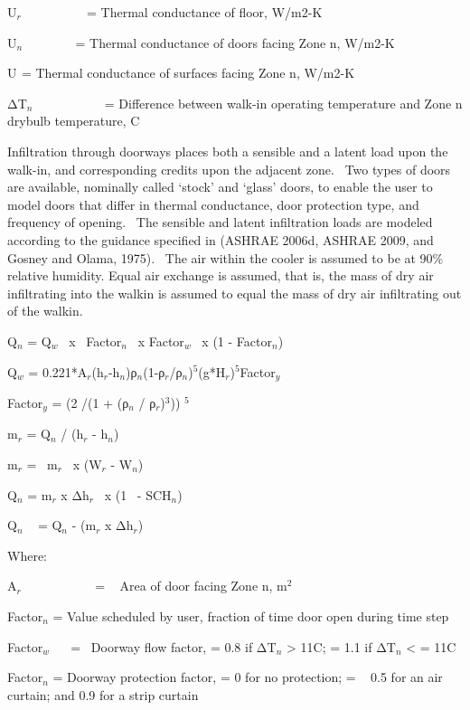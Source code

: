U\(_{r}\) ~~~~~~~~~ = Thermal conductance of floor, W/m2-K

U\(_{n}\) ~~~~~~~ = Thermal conductance of doors facing Zone n, W/m2-K

U\(_{ }\) = Thermal conductance of surfaces facing Zone n, W/m2-K

ΔT\(_{n}\) ~~~~~~~~~~ = Difference between walk-in operating temperature and Zone n drybulb temperature, C

Infiltration through doorways places both a sensible and a latent load upon the walk-in, and corresponding credits upon the adjacent zone.~ Two types of doors are available, nominally called `stock' and `glass' doors, to enable the user to model doors that differ in thermal conductance, door protection type, and frequency of opening.~ The sensible and latent infiltration loads are modeled according to the guidance specified in (ASHRAE 2006d, ASHRAE 2009, and Gosney and Olama, 1975).~ The air within the cooler is assumed to be at 90\% relative humidity. Equal air exchange is assumed, that is, the mass of dry air infiltrating into the walkin is assumed to equal the mass of dry air infiltrating out of the walkin.

Q\(_{n}\) = Q\(_{w}\) ~x~ Factor\(_{n}\) ~x Factor\(_{w}\) ~x (1 - Factor\(_{n}\))

Q\(_{w}\) = 0.221*A\(_{r}\)(h\(_{r}\)-h\(_{n}\))ρ\(_{n}\)(1-ρ\(_{r}\)/ρ\(_{n}\))\(^{5}\)(g*H\(_{r}\))\(^{5}\)Factor\(_{y}\)

Factor\(_{y}\) = (2 /(1 + (ρ\(_{n}\) / ρ\(_{r}\))\(^{3}\))) \(^{5}\)

m\(_{r}\) = Q\(_{n}\) / (h\(_{r}\) - h\(_{n}\))

m\(_{r}\) = ~m\(_{r}\) ~x (W\(_{r}\) - W\(_{n}\))

Q\(_{n}\) = m\(_{r}\) x Δh\(_{r}\) ~x (1 ~- SCH\(_{n}\))

Q\(_{n}\) ~ = Q\(_{n}\) - (m\(_{r}\) x Δh\(_{r}\))

Where:

A\(_{r}\)~~~~~~~~~~~ = ~ Area of door facing Zone n, m\(^{2}\)

Factor\(_{n}\) = Value scheduled by user, fraction of time door open during time step

Factor\(_{w}\) ~~ = ~Doorway flow factor, = 0.8 if ΔT\(_{n}\) \textgreater{} 11C; = 1.1 if ΔT\(_{n}\) \textless{} = 11C

Factor\(_{n}\) = Doorway protection factor, = 0 for no protection; = ~ 0.5 for an air curtain; and 0.9 for a strip curtain

